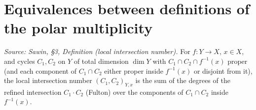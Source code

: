 

\section{Equivalences between definitions of the polar multiplicity}

\begin{definition}
  \label{def:sawin_local_intersection}
  \textit{Source: Sawin, §3, Definition (local intersection number).}
  For $f:Y\to X$, $x\in X$, and cycles $C_1,C_2$ on $Y$ of total dimension
  $\dim Y$ with $C_1\cap C_2\cap f^{-1}(x)$ proper (and each component of
  $C_1\cap C_2$ either proper inside $f^{-1}(x)$ or disjoint from it), the local
  intersection number $(C_1,C_2)_{Y,x}$ is the sum of the degrees of the refined
  intersection $C_1\cdot C_2$ (Fulton) over the components of $C_1\cap C_2$
  inside $f^{-1}(x)$.
\end{definition}

